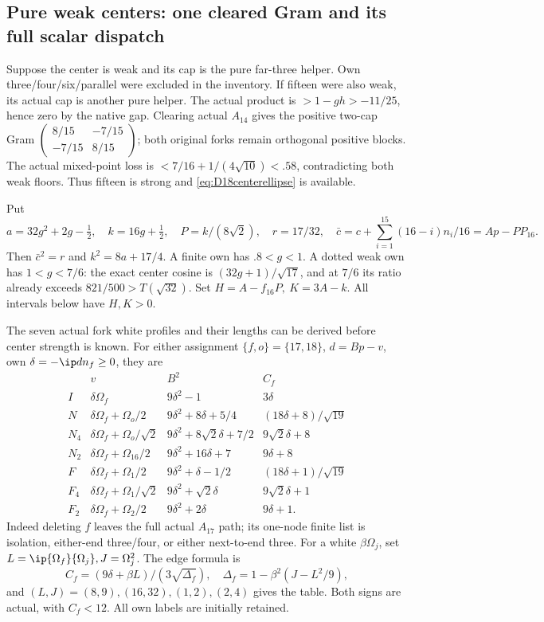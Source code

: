 \subsection{Pure weak centers: one cleared Gram and its full scalar dispatch}
\label{app:D18purecenter}
Suppose the center is weak and its cap is the pure far-three helper.
Own three/four/six/parallel were excluded in the inventory.
If fifteen were also weak, its actual cap is another pure helper.
The actual product is \(>1-gh>-11/25\), hence zero by the native gap.
Clearing actual \(A_{14}\) gives the positive two-cap Gram
\(\left(\begin{smallmatrix}8/15&-7/15\\-7/15&8/15\end{smallmatrix}\right)\);
both original forks remain orthogonal positive blocks.
The actual mixed-point loss is \(<7/16+1/(4\sqrt{10})<.58\),
contradicting both weak floors. Thus fifteen is strong and
\eqref{eq:D18centerellipse} is available.

Put
\[
 a=32g^2+2g-\tfrac12,\quad k=16g+\tfrac12,\quad
 P=k/(8\sqrt2),\quad r=17/32,\quad
 \bar c=c+\sum_{i=1}^{15}(16-i)n_i/16=Ap-PP_{16}.
\]
Then \(\bar c^2=r\) and \(k^2=8a+17/4\).
A finite own has \(.8<g<1\).
A dotted weak own has \(1<g<7/6\): the exact center cosine
is \((32g+1)/\sqrt{17}\), and at \(7/6\) its ratio already
exceeds \(821/500>T(\sqrt{32})\).
Set \(H=A-f_{16}P,\ K=3A-k\).
All intervals below have \(H,K>0\).

The seven actual fork white profiles and their lengths can be derived
before center strength is known.
For either assignment \(\{f,o\}=\{17,18\}\),
\(d=Bp-v\), own \(\delta=-\ip d{n_f}\geq0\), they are
\[
\begin{array}{c|c|c|c}
 &v&B^2&C_f\\ \hline
I&\delta\Omega_f&9\delta^2-1&3\delta\\
N&\delta\Omega_f+\Omega_o/2&9\delta^2+8\delta+5/4&(18\delta+8)/\sqrt{19}\\
N_4&\delta\Omega_f+\Omega_o/\sqrt2&9\delta^2+8\sqrt2\delta+7/2&9\sqrt2\delta+8\\
N_2&\delta\Omega_f+\Omega_{16}/2&9\delta^2+16\delta+7&9\delta+8\\
F&\delta\Omega_f+\Omega_1/2&9\delta^2+\delta-1/2&(18\delta+1)/\sqrt{19}\\
F_4&\delta\Omega_f+\Omega_1/\sqrt2&9\delta^2+\sqrt2\delta&9\sqrt2\delta+1\\
F_2&\delta\Omega_f+\Omega_2/2&9\delta^2+2\delta&9\delta+1 .
\end{array}
\]
Indeed deleting \(f\) leaves the full actual \(A_{17}\) path;
its one-node finite list is isolation, either-end three/four,
or either next-to-end three.
For a white \(\beta\Omega_j\), set
\(L=\ip{\Omega_f}{\Omega_j},J=\Omega_j^2\).
The edge formula is
\[
 C_f=(9\delta+\beta L)/(3\sqrt{\Delta_f}),\quad
 \Delta_f=1-\beta^2(J-L^2/9),
\]
and \((L,J)=(8,9),(16,32),(1,2),(2,4)\) gives the table.
Both signs are actual, with \(C_f<12\).
All own labels are initially retained.

